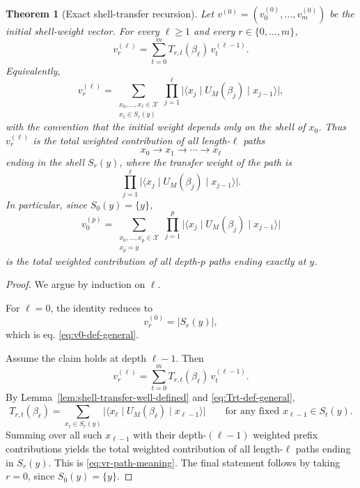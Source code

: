 \documentclass[a4paper,onecolumn,11pt,unpublished]{quantumarticle}
\newtheorem{theorem}{Theorem}
\theoremstyle{remark}
\begin{document}
\begin{theorem}[Exact shell-transfer recursion]
\label{thm:exact-shell-transfer-recursion}
Let \(v^{(0)}=(v^{(0)}_0,\dots,v^{(0)}_m)\) be the initial shell-weight vector.
For every \(\ell\ge 1\) and every \(r\in\{0,\dots,m\}\),
\begin{equation}
\label{eq:exact-shell-transfer-recursion}
v_r^{(\ell)}
=
\sum_{t=0}^{m} T_{r,t}(\beta_\ell)\,v_t^{(\ell-1)} .
\end{equation}
Equivalently,
\begin{equation}
\label{eq:vr-path-meaning}
v_r^{(\ell)}
=
\sum_{\substack{x_0,\dots,x_\ell\in \mathcal X\\ x_\ell\in S_r(y)}}
\prod_{j=1}^{\ell}
\bigl|\langle x_j\mid U_M(\beta_j)\mid x_{j-1}\rangle\bigr|,
\end{equation}
with the convention that the initial weight depends only on the shell of
\(x_0\). Thus \(v_r^{(\ell)}\) is the total weighted contribution of all
length-\(\ell\) paths
\[
x_0\to x_1\to\cdots\to x_\ell
\]
ending in the shell \(S_r(y)\), where the transfer weight of the path is
\[
\prod_{j=1}^{\ell}
\bigl|\langle x_j\mid U_M(\beta_j)\mid x_{j-1}\rangle\bigr|.
\]
In particular, since \(S_0(y)=\{y\}\),
\begin{equation}
\label{eq:v0-closed-form}
v_0^{(p)}
=
\sum_{\substack{x_0,\dots,x_p\in \mathcal X\\ x_p=y}}
\prod_{j=1}^{p}
\bigl|\langle x_j\mid U_M(\beta_j)\mid x_{j-1}\rangle\bigr|
\end{equation}
is the total weighted contribution of all depth-\(p\) paths ending exactly at
\(y\).
\end{theorem}


\begin{proof}
We argue by induction on \(\ell\).

For \(\ell=0\), the identity reduces to
\[
v_r^{(0)}=|S_r(y)|,
\]
which is eq. \eqref{eq:v0-def-general}.

Assume the claim holds at depth \(\ell-1\). Then
\[
v_r^{(\ell)}
=
\sum_{t=0}^{m}T_{r,t}(\beta_\ell)\,v_t^{(\ell-1)}.
\]
By Lemma~\ref{lem:shell-transfer-well-defined} and \cref{eq:Trt-def-general},
\[
T_{r,t}(\beta_\ell)
=
\sum_{x_\ell\in S_r(y)}
\bigl|\langle x_\ell\mid U_M(\beta_\ell)\mid x_{\ell-1}\rangle\bigr|
\qquad
\text{for any fixed }x_{\ell-1}\in S_t(y).
\]
Summing over all such \(x_{\ell-1}\) with their depth-\((\ell-1)\) weighted
prefix contributions yields the total weighted contribution of all
length-\(\ell\) paths ending in \(S_r(y)\). This is
\eqref{eq:vr-path-meaning}. The final statement follows by taking \(r=0\),
since \(S_0(y)=\{y\}\).
\end{proof}
\end{document}
